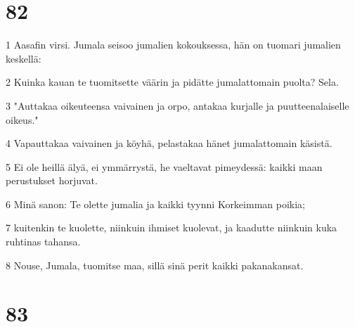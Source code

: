 \chapter{82}

\par 1 Aasafin virsi. Jumala seisoo jumalien kokouksessa, hän on tuomari jumalien keskellä:
\par 2 Kuinka kauan te tuomitsette väärin ja pidätte jumalattomain puolta? Sela.
\par 3 "Auttakaa oikeuteensa vaivainen ja orpo, antakaa kurjalle ja puutteenalaiselle oikeus."
\par 4 Vapauttakaa vaivainen ja köyhä, pelastakaa hänet jumalattomain käsistä.
\par 5 Ei ole heillä älyä, ei ymmärrystä, he vaeltavat pimeydessä: kaikki maan perustukset horjuvat.
\par 6 Minä sanon: Te olette jumalia ja kaikki tyynni Korkeimman poikia;
\par 7 kuitenkin te kuolette, niinkuin ihmiset kuolevat, ja kaadutte niinkuin kuka ruhtinas tahansa.
\par 8 Nouse, Jumala, tuomitse maa, sillä sinä perit kaikki pakanakansat.

\chapter{83}

